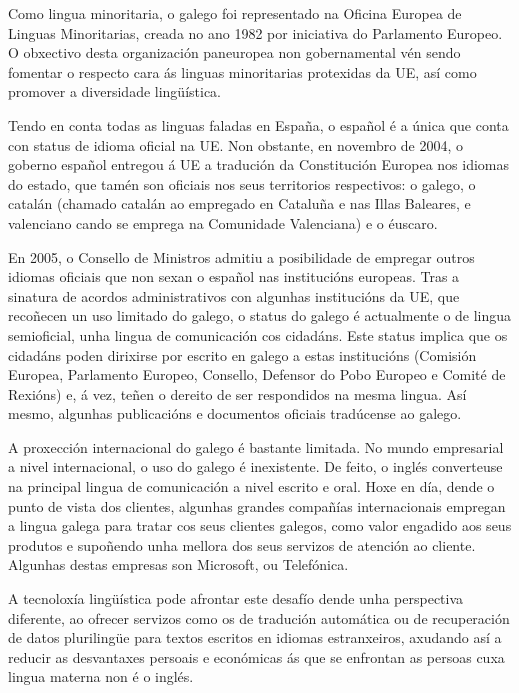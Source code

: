 \begin{multicols}{2}
Como lingua minoritaria, o galego foi representado na Oficina Europea de Linguas Minoritarias, creada no ano 1982 por iniciativa do Parlamento Europeo. O obxectivo desta organización paneuropea non gobernamental vén sendo fomentar o respecto cara ás linguas minoritarias protexidas da UE, así como promover a diversidade lingüística.

Tendo en conta todas as linguas faladas en España, o español é a única que conta con status de idioma oficial na UE. Non obstante, en novembro de 2004, o goberno español entregou á UE a tradución da Constitución Europea nos idiomas do estado, que tamén son oficiais nos seus territorios respectivos: o galego, o catalán (chamado catalán ao empregado en Cataluña e nas Illas Baleares, e valenciano cando se emprega na Comunidade Valenciana) e o éuscaro. 

En 2005, o Consello de Ministros admitiu a posibilidade de empregar outros idiomas oficiais que non sexan o español nas institucións europeas. Tras a sinatura de acordos administrativos con algunhas institucións da UE, que recoñecen un uso limitado do galego, o status do galego é actualmente o de lingua semioficial, unha lingua de comunicación cos cidadáns. Este status implica que os cidadáns poden dirixirse por escrito en galego a estas institucións (Comisión Europea, Parlamento Europeo, Consello, Defensor do Pobo Europeo e Comité de Rexións) e, á vez, teñen o dereito de ser respondidos na mesma lingua. Así mesmo, algunhas publicacións e documentos oficiais tradúcense ao galego. 

A proxección internacional do galego é bastante limitada. No mundo empresarial a nivel internacional, o uso do galego é inexistente. De feito, o inglés converteuse na principal lingua de comunicación a nivel escrito e oral. Hoxe en día, dende o punto de vista dos clientes, algunhas grandes compañías internacionais empregan a lingua galega para tratar cos seus clientes galegos, como valor engadido aos seus produtos e supoñendo unha mellora dos seus servizos de atención ao cliente. Algunhas destas empresas son Microsoft, ou Telefónica.

A tecnoloxía lingüística pode afrontar este desafío dende unha perspectiva diferente, ao ofrecer servizos como os de tradución automática ou de recuperación de datos plurilingüe para textos escritos en idiomas estranxeiros, axudando así a reducir as desvantaxes persoais e económicas ás que se enfrontan as persoas cuxa lingua materna non é o inglés.


\end{multicols}
